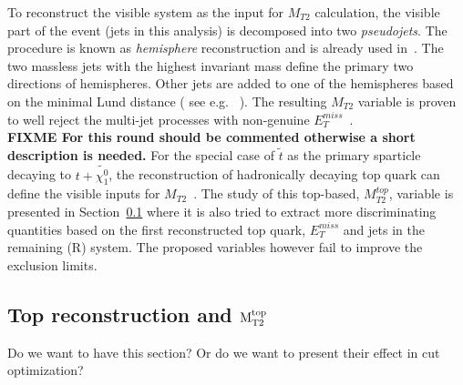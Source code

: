 To reconstruct the visible system as the input for $M_{T2}$ calculation, the visible part of the event (jets in this analysis) is decomposed into two \textit{pseudojets}. The procedure is known as \textit{hemisphere} reconstruction and is already used in~\cite{CMS-PAS-SUS-12-002}. The two massless jets with the highest invariant mass define the primary two directions of hemispheres. Other jets are added to one of the hemispheres based on the minimal Lund distance ( see e.g. ~\cite{Sjostrand:2006za}). The resulting $M_{T2}$ variable is proven to well reject the multi-jet processes with non-genuine $E_{T}^{miss}$~\cite{CMS-PAS-SUS-12-002}. \\

{\bf FIXME For this round should be commented otherwise a short description is needed.}
For the special case of $\tilde{t}$ as the primary sparticle decaying to $t+\tilde{\chi^0_1}$, the reconstruction of hadronically decaying top quark can define the visible inputs for $M_{T2}$~\cite{MT2_2011}. The study of this top-based, $M_{T2}^{top}$, variable is presented in Section~\ref{subsect:mt2top} where it is also tried to extract more discriminating quantities based on the first reconstructed top quark, $E_T^{miss}$ and jets in the remaining (R) system. The proposed variables however fail to improve the exclusion limits.
\subsection{\texorpdfstring{Top reconstruction and $\rm {M_{T2}^{top}}$}{Top reconstruction and MT2top}}
\label{subsect:mt2top}
Do we want to have this section? Or do we want to present their effect in cut optimization?

